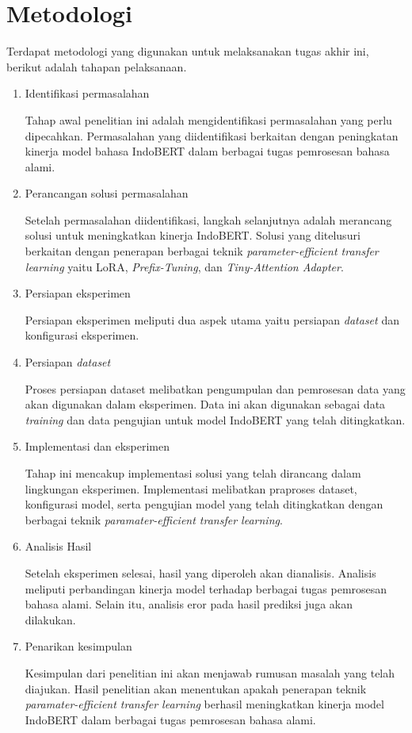 \section{Metodologi}

Terdapat metodologi yang digunakan untuk melaksanakan tugas akhir ini, berikut adalah tahapan pelaksanaan.

\begin{enumerate}
    \item Identifikasi permasalahan
    
    Tahap awal penelitian ini adalah mengidentifikasi permasalahan yang perlu dipecahkan. Permasalahan yang diidentifikasi berkaitan dengan peningkatan kinerja model bahasa IndoBERT dalam berbagai tugas pemrosesan bahasa alami.

    \item Perancangan solusi permasalahan
    
    Setelah permasalahan diidentifikasi, langkah selanjutnya adalah merancang solusi untuk meningkatkan kinerja IndoBERT. Solusi yang ditelusuri berkaitan dengan penerapan berbagai teknik \textit{parameter-efficient transfer learning} yaitu LoRA, \textit{Prefix-Tuning}, dan \textit{Tiny-Attention Adapter}.

    \item Persiapan eksperimen
    
    Persiapan eksperimen meliputi dua aspek utama yaitu persiapan \textit{dataset} dan konfigurasi eksperimen.

    \item Persiapan \textit{dataset}
    
    Proses persiapan dataset melibatkan pengumpulan dan pemrosesan data yang akan digunakan dalam eksperimen. Data ini akan digunakan sebagai data \textit{training} dan data pengujian untuk model IndoBERT yang telah ditingkatkan.

    \item Implementasi dan eksperimen
    
    Tahap ini mencakup implementasi solusi yang telah dirancang dalam lingkungan eksperimen. Implementasi melibatkan praproses dataset, konfigurasi model, serta pengujian model yang telah ditingkatkan dengan berbagai teknik \textit{paramater-efficient transfer learning}.

    \item Analisis Hasil
    
    Setelah eksperimen selesai, hasil yang diperoleh akan dianalisis. Analisis meliputi perbandingan kinerja model terhadap berbagai tugas pemrosesan bahasa alami. Selain itu, analisis eror pada hasil prediksi juga akan dilakukan.

    \item Penarikan kesimpulan
    
    Kesimpulan dari penelitian ini akan menjawab rumusan masalah yang telah diajukan. Hasil penelitian akan menentukan apakah penerapan teknik \textit{paramater-efficient transfer learning} berhasil meningkatkan kinerja model IndoBERT dalam berbagai tugas pemrosesan bahasa alami.

\end{enumerate}